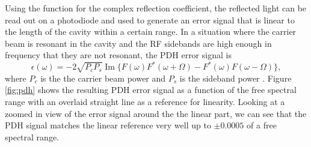 Using the function for the complex reflection coefficient, the reflected light 
can be read out on a photodiode and used to generate an 
error signal that is linear to the length of the cavity within a certain range. 
In a situation where the carrier beam is resonant in the cavity and the RF 
sidebands are high enough in frequency that they are not resonant, the PDH error 
signal is
\begin{equation}
\epsilon(\omega) = -2\sqrt{P_{c}P_{s}}\operatorname{Im}\{F(\omega)F^*(\omega + \Omega) - F^*(\omega)F(\omega - \Omega)\},
\end{equation}
where $P_{c}$ is the the carrier beam power and $P_{s}$ is the sideband power 
\cite{Black01}.
Figure \ref{fig:pdh} shows the resulting PDH error signal as a function of 
the free spectral range with an overlaid straight line as a reference for 
linearity. Looking at a zoomed in view of the error signal around the the linear 
part, we can see that the PDH signal matches the linear reference very well 
up to $\pm0.0005$ of a free spectral range.

